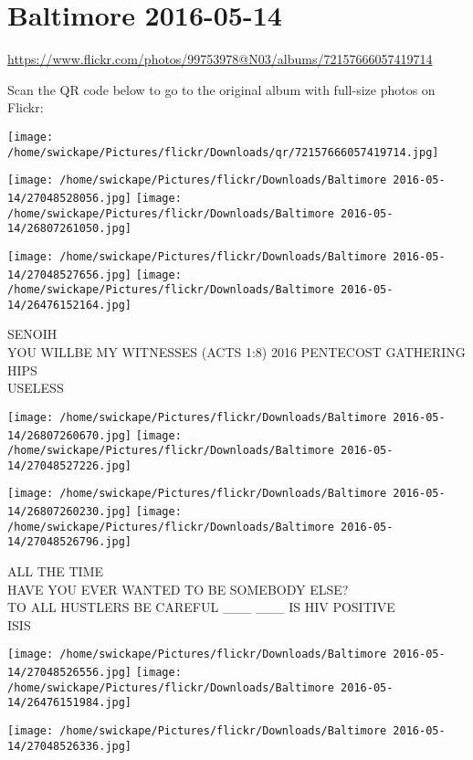 \documentclass[10pt,letterpaper]{article}
\title{}
\author{}
\date{}
\begin{document}
\section*{Baltimore 2016-05-14}

\url{https://www.flickr.com/photos/99753978@N03/albums/72157666057419714}

Scan the QR code below to go to the original album with full-size photos on Flickr:

\texttt{[image: /home/swickape/Pictures/flickr/Downloads/qr/72157666057419714.jpg]}
\pagebreak

\texttt{[image: /home/swickape/Pictures/flickr/Downloads/Baltimore 2016-05-14/27048528056.jpg]}
\texttt{[image: /home/swickape/Pictures/flickr/Downloads/Baltimore 2016-05-14/26807261050.jpg]}

\texttt{[image: /home/swickape/Pictures/flickr/Downloads/Baltimore 2016-05-14/27048527656.jpg]}
\texttt{[image: /home/swickape/Pictures/flickr/Downloads/Baltimore 2016-05-14/26476152164.jpg]}

SENOIH\\
YOU WILLBE MY WITNESSES (ACTS 1:8) 2016 PENTECOST GATHERING\\
HIPS\\
USELESS
\pagebreak

\texttt{[image: /home/swickape/Pictures/flickr/Downloads/Baltimore 2016-05-14/26807260670.jpg]}
\texttt{[image: /home/swickape/Pictures/flickr/Downloads/Baltimore 2016-05-14/27048527226.jpg]}

\texttt{[image: /home/swickape/Pictures/flickr/Downloads/Baltimore 2016-05-14/26807260230.jpg]}
\texttt{[image: /home/swickape/Pictures/flickr/Downloads/Baltimore 2016-05-14/27048526796.jpg]}

ALL THE TIME\\
HAVE YOU EVER WANTED TO BE SOMEBODY ELSE?\\
TO ALL HUSTLERS BE CAREFUL \_\_\_ \_\_\_ IS HIV POSITIVE\\
ISIS
\pagebreak

\texttt{[image: /home/swickape/Pictures/flickr/Downloads/Baltimore 2016-05-14/27048526556.jpg]}
\texttt{[image: /home/swickape/Pictures/flickr/Downloads/Baltimore 2016-05-14/26476151984.jpg]}

\texttt{[image: /home/swickape/Pictures/flickr/Downloads/Baltimore 2016-05-14/27048526336.jpg]}
\end{document}
